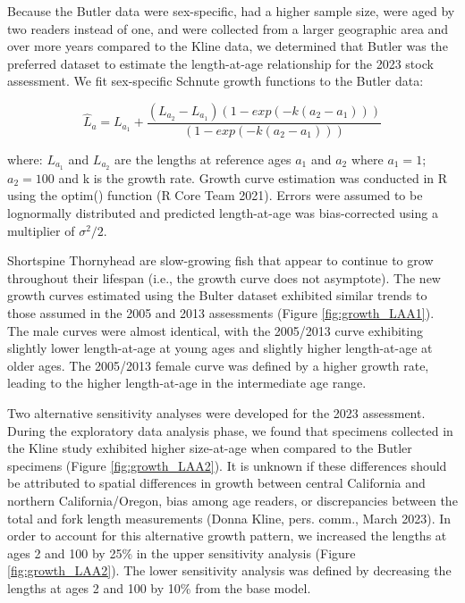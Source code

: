 \documentclass[11pt,
  english,
  letterpaper,
]{article}
\begin{document}
Because the Butler data were sex-specific, had a higher sample size, were aged by two readers instead of one, and were collected from a larger geographic area and over more years compared to the Kline data, we determined that Butler was the preferred dataset to estimate the length-at-age relationship for the 2023 stock assessment. We fit sex-specific Schnute growth functions to the Butler data:

\begin{equation} \hat{L}_{a} = L_{a_{1}}+\frac{(L_{a_{2}}-L_{a_{1}})(1-exp(-k(a_{2}-a_{1})))}{(1-exp(-k(a_{2}-a_{1})))}\end{equation}

where: \(L_{a_{1}}\) and \(L_{a_{2}}\) are the lengths at reference ages \(a_{1}\) and \(a_{2}\) where \(a_{1}=1\);\(a_{2}=100\) and k is the growth rate. Growth curve estimation was conducted in R using the optim() function (R Core Team 2021). Errors were assumed to be lognormally distributed and predicted length-at-age was bias-corrected using a multiplier of \(\sigma^2/2\).

Shortspine Thornyhead are slow-growing fish that appear to continue to grow throughout their lifespan (i.e., the growth curve does not asymptote). The new growth curves estimated using the Bulter dataset exhibited similar trends to those assumed in the 2005 and 2013 assessments (Figure \ref{fig:growth_LAA1}). The male curves were almost identical, with the 2005/2013 curve exhibiting slightly lower length-at-age at young ages and slightly higher length-at-age at older ages. The 2005/2013 female curve was defined by a higher growth rate, leading to the higher length-at-age in the intermediate age range.

Two alternative sensitivity analyses were developed for the 2023 assessment. During the exploratory data analysis phase, we found that specimens collected in the Kline study exhibited higher size-at-age when compared to the Butler specimens (Figure \ref{fig:growth_LAA2}). It is unknown if these differences should be attributed to spatial differences in growth between central California and northern California/Oregon, bias among age readers, or discrepancies between the total and fork length measurements (Donna Kline, pers. comm., March 2023). In order to account for this alternative growth pattern, we increased the lengths at ages 2 and 100 by 25\% in the upper sensitivity analysis (Figure \ref{fig:growth_LAA2}). The lower sensitivity analysis was defined by decreasing the lengths at ages 2 and 100 by 10\% from the base model.
\end{document}
